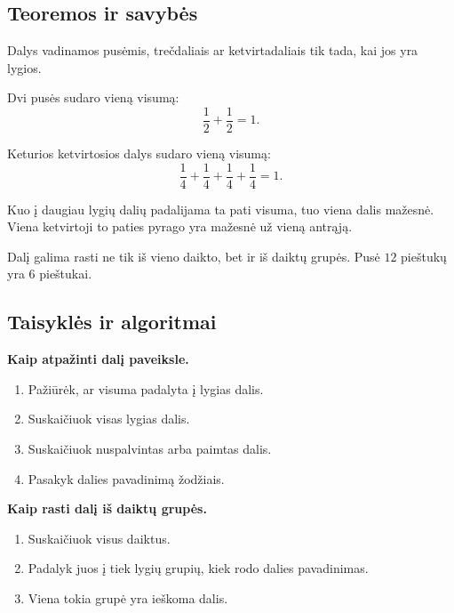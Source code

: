 \subsection{Teoremos ir savybės}

\begin{savybe}
Dalys vadinamos pusėmis, trečdaliais ar ketvirtadaliais tik tada, kai jos yra lygios.
\end{savybe}

\begin{savybe}
Dvi pusės sudaro vieną visumą:
\[
\frac{1}{2}+\frac{1}{2}=1.
\]
\end{savybe}

\begin{savybe}
Keturios ketvirtosios dalys sudaro vieną visumą:
\[
\frac{1}{4}+\frac{1}{4}+\frac{1}{4}+\frac{1}{4}=1.
\]
\end{savybe}

\begin{savybe}
Kuo į daugiau lygių dalių padalijama ta pati visuma, tuo viena dalis mažesnė. Viena ketvirtoji to paties pyrago yra mažesnė už vieną antrąją.
\end{savybe}

\begin{pastaba}
Dalį galima rasti ne tik iš vieno daikto, bet ir iš daiktų grupės. Pusė \(12\) pieštukų yra \(6\) pieštukai.
\end{pastaba}

\subsection{Taisyklės ir algoritmai}

\textbf{Kaip atpažinti dalį paveiksle.}
\begin{enumerate}
\item Pažiūrėk, ar visuma padalyta į lygias dalis.
\item Suskaičiuok visas lygias dalis.
\item Suskaičiuok nuspalvintas arba paimtas dalis.
\item Pasakyk dalies pavadinimą žodžiais.
\end{enumerate}

\textbf{Kaip rasti dalį iš daiktų grupės.}
\begin{enumerate}
\item Suskaičiuok visus daiktus.
\item Padalyk juos į tiek lygių grupių, kiek rodo dalies pavadinimas.
\item Viena tokia grupė yra ieškoma dalis.
\end{enumerate}

